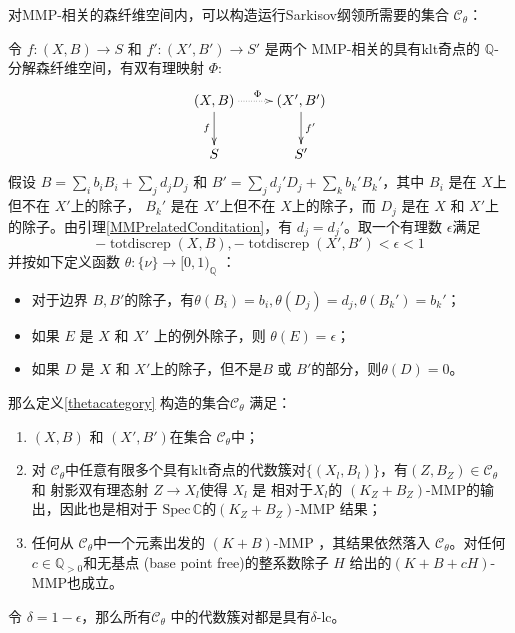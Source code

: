  对MMP-相关的森纤维空间内，可以构造运行Sarkisov纲领所需要的集合 $\mathcal{C}_{\theta} $：
\begin{proposition}\cite[Lemma 3.6]{brunoLogSarkisovProgram1995}\label{cat}
  令 $ f:(X,B)\to S$ 和 $f':(X',B')\to S' $ 是两个 MMP-相关的具有klt奇点的 $ \mathbb{Q} $-分解森纤维空间，有双有理映射 $\Phi$:
  \[ \xymatrix{
      {(X,B)}\ar[d]_{f}\ar@{.>}[r]^\Phi&(X',B')\ar[d]^{f'}\\
      S&S'} \]
假设 $ B=\sum_{i}b_{i}B_{i}+\sum_{j}d_{j}D_j $ 和 $ B'=\sum_{j}d_{j}'D_{j}+\sum_{k}b_{k}'B_{k}' $，其中 $ B_{i} $ 是在 $ X $上但不在 $ X' $上的除子， $ B_k' $ 是在 $ X' $上但不在  $ X $上的除子，而 $ D_j $ 是在 $ X $ 和 $ X' $上的除子。由引理\ref{MMPrelatedConditation}，有 $ d_{j}=d_{j}' $。取一个有理数 $\epsilon$满足 
\[ -\operatorname{totdiscrep}(X,B),-\operatorname{totdiscrep}(X',B')  <\epsilon <1 \]
并按如下定义函数 $ \theta: \{ \nu \} \to [0,1)_{\mathbb{Q}} $ ：
  \begin{itemize}
    \item 对于边界  $B,B'$的除子，有$ \theta(B_i)=b_i, \theta(D_{j})=d_{j},\theta(B_{k}')=b_{k}'$；
    \item  如果 $E$ 是 $X$ 和 $X'$ 上的例外除子，则    $ \theta(E)=\epsilon $；
    \item   如果 $ D $ 是 $ X $ 和 $ X' $上的除子，但不是$ B $ 或 $ B' $的部分，则$ \theta(D)=0 $。
  \end{itemize}
  那么定义\ref{thetacategory} 构造的集合$ \mathcal{C}_{\theta} $ 满足：
  \begin{enumerate}
    \item $ (X,B) $ 和 $ (X',B') $在集合 $ \mathcal{C}_{\theta} $中；
    \item   对 $ \mathcal{C}_{\theta} $中任意有限多个具有klt奇点的代数簇对$ \{(X_l,B_l)\} $，有$ (Z,B_Z)\in \mathcal{C}_{\theta} $ 和 射影双有理态射 $ Z\to X_l $使得 $X_{l}$ 是 相对于$X_{l}$的   $ (K_{Z}+B_{Z}) $-MMP的输出，因此也是相对于 $ \mathrm{Spec}\,\mathbb{C} $的$(K_Z+B_Z)$-MMP 结果；
    \item 任何从  $ \mathcal{C}_{\theta} $中一个元素出发的 $ (K+B) $-MMP ，其结果依然落入 $ \mathcal{C}_{\theta} $。对任何$ c\in \mathbb{Q}_{>0} $和无基点 (base point free)的整系数除子 $H$ 给出的$ (K+B+cH) $-MMP也成立。
  \end{enumerate}
\end{proposition}
\begin{remark}\label{delta-lc}
  令 $\delta=1-\epsilon$，那么所有$\mathcal{C}_{\theta}$ 中的代数簇对都是具有$\delta$-lc。
\end{remark}

